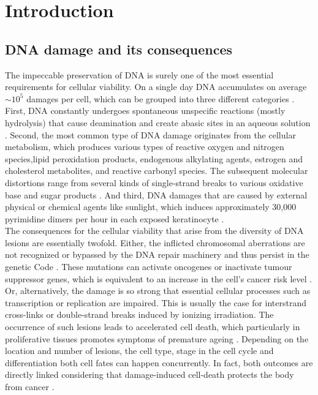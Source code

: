 \chapter{Introduction}
\pagestyle{plain}

\section{DNA damage and its consequences}

The impeccable preservation of DNA is surely one of the most essential requirements for cellular viability. On a single day DNA accumulates on average $\sim\text{10}^\text{5}$ damages per cell, which can be grouped into three different categories \cite{Hoeijmakers2009}. First, DNA constantly undergoes spontaneous unspecific reactions (mostly hydrolysis) that cause deamination and create abasic sites in an aqueous solution \cite{Lindahl1993,Lhomme1999}. Second, the most common type of DNA damage originates from the cellular metabolism, which produces various types of reactive oxygen and nitrogen species,lipid peroxidation products, endogenous alkylating agents, estrogen and cholesterol metabolites, and reactive carbonyl species. The subsequent molecular distortions range from several kinds of single-strand breaks to various oxidative base and sugar products \cite{DeBont2004,Sander2005}. And third, DNA damages that are caused by external physical or chemical agents like sunlight, which induces approximately 30,000 pyrimidine dimers per hour in each exposed keratinocyte \cite{Luijsterburg2010}.\\        
The consequences for the cellular viability that arise from the diversity of DNA lesions are essentially twofold. Either, the inflicted chromosomal aberrations are not recognized or bypassed by the DNA repair machinery and thus persist in the genetic Code \cite{Hoeijmakers2009}. These mutations can activate oncogenes or inactivate tumour suppressor genes, which is equivalent to an increase in the cell's cancer risk level \cite{Bartek2007}. Or, alternatively, the damage is so strong that essential cellular processes such as transcription or replication are impaired. This is usually the case for interstrand cross-links or double-strand breaks induced by ionizing irradiation. The occurrence of such lesions leads to accelerated cell death, which particularly in proliferative tissues promotes symptoms of premature ageing \cite{Marteijn2014}. Depending on the location and number of lesions, the cell type, stage in the cell cycle and differentiation both cell fates can happen concurrently. In fact, both outcomes are directly linked considering that damage-induced cell-death protects the body from cancer \cite{Hoeijmakers2009}.            

